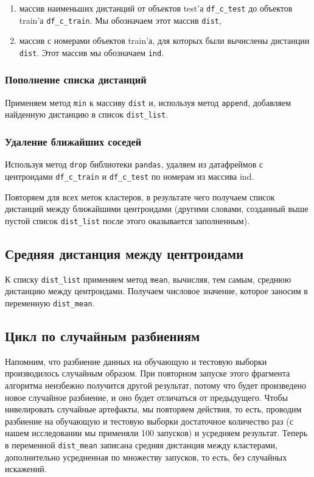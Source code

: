 \documentclass[a4paper,12pt]{article}
\begin{document}
\medskip\noindent

\begin{enumerate}
	\item массив наименьших дистанций от объектов test'а \texttt{df\_c\_test} до объектов train'а \texttt{df\_c\_train}. Мы обозначаем этот массив \texttt{dist},
	\item массив с номерами объектов train'а, для которых были вычислены дистанции \texttt{dist}. Этот массив мы обозначаем \texttt{ind}. 
\end{enumerate}

\subsubsection{Пополнение списка дистанций}

Применяем метод \texttt{min} к массиву \texttt{dist} и, используя метод \texttt{append}, добавляем найденную дистанцию в список \texttt{dist\_list}.


\subsubsection{Удаление ближайших соседей}

Используя метод \texttt{drop} библиотеки \texttt{pandas}, удаляем из датафреймов с центроидами \texttt{df\_c\_train} и \texttt{df\_c\_test} по номерам из массива ind.

Повторяем для всех меток кластеров, в результате чего получаем список дистанций между ближайшими центроидами (другими словами, созданный выше пустой список \texttt{dist\_list} после этого оказывается заполненным).


\subsection{Средняя дистанция между центроидами}


К списку \texttt{dist\_list} применяем метод \texttt{mean}, вычисляя, тем самым, среднюю дистанцию между центроидами. Получаем числовое значение, которое заносим в переменную \texttt{dist\_mean}.

\subsection{Цикл по случайным разбиениям}

Напомним, что разбиение данных на обучающую и тестовую выборки производилось случайным образом. При повторном запуске этого фрагмента алгоритма неизбежно получится другой результат, потому что будет произведено новое случайное разбиение, и оно будет отличаться от предыдущего. Чтобы нивелировать случайные артефакты, мы повторяем действия, то есть, проводим разбиение на обучающую и тестовую выборки достаточное количество раз (с нашем исследовании мы применяли 100 запусков) и усредняем результат.  Теперь в переменной \texttt{dist\_mean} записана средняя дистанция между кластерами, дополнительно усредненная по множеству запусков, то есть, без случайных искажений.
\end{document}
